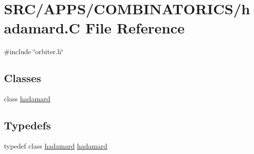 \hypertarget{hadamard_8_c}{}\section{S\+R\+C/\+A\+P\+P\+S/\+C\+O\+M\+B\+I\+N\+A\+T\+O\+R\+I\+C\+S/hadamard.C File Reference}
\label{hadamard_8_c}
{\ttfamily \#include \char`\"{}orbiter.\+h\char`\"{}}\newline
\subsection*{Classes}
\begin{DoxyCompactItemize}
\item 
class \mbox{\hyperlink{classhadamard}{hadamard}}
\end{DoxyCompactItemize}
\subsection*{Typedefs}
\begin{DoxyCompactItemize}
\item 
typedef class \mbox{\hyperlink{classhadamard}{hadamard}} \mbox{\hyperlink{hadamard_8_c_a89981e30debe41ebf66bb2498fdabbfc}{hadamard}}
\end{DoxyCompactItemize}
